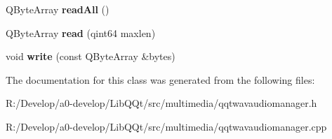\begin{DoxyCompactItemize}
\mbox{\label{class_q_qt_wav_audio_manager_a2bd9431da37dafd48b601f6ed9d3e9f9}} 
Q\+Byte\+Array {\bfseries read\+All} ()
\item 
\mbox{\label{class_q_qt_wav_audio_manager_a95c51579d77976ca7d7125f04abea786}} 
Q\+Byte\+Array {\bfseries read} (qint64 maxlen)
\item 
\mbox{\label{class_q_qt_wav_audio_manager_a47a5e90a62776a22631ef55a177d04f5}} 
void {\bfseries write} (const Q\+Byte\+Array \&bytes)
\end{DoxyCompactItemize}


The documentation for this class was generated from the following files\+:\begin{DoxyCompactItemize}
\item 
R\+:/\+Develop/a0-\/develop/\+Lib\+Q\+Qt/src/multimedia/qqtwavaudiomanager.\+h\item 
R\+:/\+Develop/a0-\/develop/\+Lib\+Q\+Qt/src/multimedia/qqtwavaudiomanager.\+cpp\end{DoxyCompactItemize}
